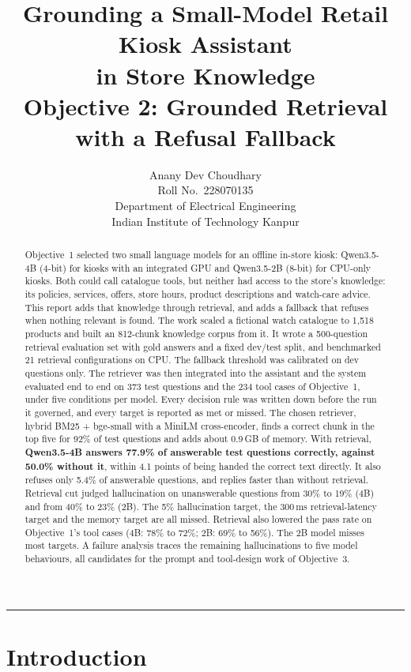 \documentclass[11pt,a4paper]{article}
\title{\textbf{Grounding a Small-Model Retail Kiosk Assistant\\in Store Knowledge}\\[4pt]
\large Objective 2: Grounded Retrieval with a Refusal Fallback}
\author{Anany Dev Choudhary\\\small Roll No.\ 228070135\\\small Department of Electrical Engineering\\\small Indian
Institute of Technology Kanpur}
\date{\reportdate}
\begin{document}
\maketitle

\begin{abstract}
\noindent
Objective~1 selected two small language models for an offline in-store kiosk: Qwen3.5-4B (4-bit) for kiosks with an
integrated GPU and Qwen3.5-2B (8-bit) for CPU-only kiosks. Both could call catalogue tools, but neither had access to
the store's knowledge: its policies, services, offers, store hours, product descriptions and watch-care advice. This
report adds that knowledge through retrieval, and adds a fallback that refuses when nothing relevant is found. The work
scaled a fictional watch catalogue to 1,518 products and built an 812-chunk knowledge corpus from it. It wrote a
500-question retrieval evaluation set with gold answers and a fixed dev/test split, and benchmarked 21 retrieval
configurations on CPU. The fallback threshold was calibrated on dev questions only. The retriever was then integrated
into the assistant and the system evaluated end to end on 373 test questions and the 234 tool cases of Objective~1,
under five conditions per model. Every decision rule was written down before the run it governed, and every target is
reported as met or missed.
The chosen retriever, hybrid BM25 + bge-small with a MiniLM cross-encoder, finds a correct chunk in the top five for
92\% of test questions and adds about 0.9\,GB of memory. With retrieval, \textbf{Qwen3.5-4B answers 77.9\% of answerable
test questions correctly, against 50.0\% without it}, within 4.1 points of being handed the correct text directly. It
also refuses only 5.4\% of answerable questions, and replies faster than without retrieval. Retrieval cut judged
hallucination on unanswerable questions from 30\% to 19\% (4B) and from 40\% to 23\% (2B). The 5\% hallucination
target, the 300\,ms retrieval-latency target and the memory target are all missed. Retrieval also lowered the pass rate
on Objective~1's tool cases (4B: 78\% to 72\%; 2B: 69\% to 56\%). The 2B model misses most targets. A failure
analysis traces the remaining hallucinations to five model behaviours, all candidates for the prompt and tool-design
work of Objective~3.
\end{abstract}

\tableofcontents
\vspace{6pt}
\hrule

\section{Introduction}
\end{document}
